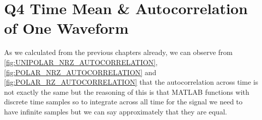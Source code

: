 \chapter[Q4 Time Mean \& Autocorrelation of One Waveform]{Q4 Time Mean \& Autocorrelation of One Waveform}
\label{cp:q4-time-mean-autocorrelation}

As we calculated from the previous chapters already, we can observe from
\autoref{fig:UNIPOLAR_NRZ_AUTOCORRELATION},
\autoref{fig:POLAR_NRZ_AUTOCORRELATION} and
\autoref{fig:POLAR_RZ_AUTOCORRELATION} that the autocorrelation across time is
not exactly the same but the reasoning of this is that MATLAB functions with
discrete time samples so to integrate across all time for the signal we need to
have infinite samples but we can say approximately that they are equal.